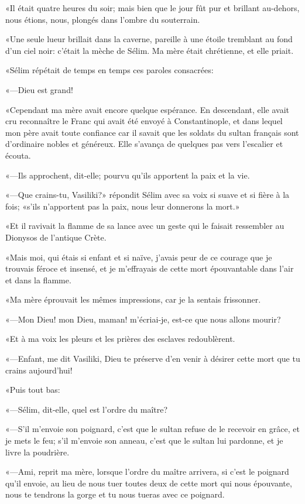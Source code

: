 «Il était quatre heures du soir; mais bien que le jour fût pur et brillant au-dehors, nous étions, nous, plongés dans l'ombre du souterrain. 

«Une seule lueur brillait dans la caverne, pareille à une étoile tremblant au fond d'un ciel noir: c'était la mèche de Sélim. Ma mère était chrétienne, et elle priait. 

«Sélim répétait de temps en temps ces paroles consacrées: 

«—Dieu est grand! 

«Cependant ma mère avait encore quelque espérance. En descendant, elle avait cru reconnaître le Franc qui avait été envoyé à Constantinople, et dans lequel mon père avait toute confiance car il savait que les soldats du sultan français sont d'ordinaire nobles et généreux. Elle s'avança de quelques pas vers l'escalier et écouta. 

«—Ils approchent, dit-elle; pourvu qu'ils apportent la paix et la vie. 

«—Que crains-tu, Vasiliki?» répondit Sélim avec sa voix si suave et si fière à la fois; «s'ils n'apportent pas la paix, nous leur donnerons la mort.» 

«Et il ravivait la flamme de sa lance avec un geste qui le faisait ressembler au Dionysos de l'antique Crète. 

«Mais moi, qui étais si enfant et si naïve, j'avais peur de ce courage que je trouvais féroce et insensé, et je m'effrayais de cette mort épouvantable dans l'air et dans la flamme. 

«Ma mère éprouvait les mêmes impressions, car je la sentais frissonner. 

«—Mon Dieu! mon Dieu, maman! m'écriai-je, est-ce que nous allons mourir? 

«Et à ma voix les pleurs et les prières des esclaves redoublèrent. 

«—Enfant, me dit Vasiliki, Dieu te préserve d'en venir à désirer cette mort que tu crains aujourd'hui! 

«Puis tout bas: 

«—Sélim, dit-elle, quel est l'ordre du maître? 

«—S'il m'envoie son poignard, c'est que le sultan refuse de le recevoir en grâce, et je mets le feu; s'il m'envoie son anneau, c'est que le sultan lui pardonne, et je livre la poudrière. 

«—Ami, reprit ma mère, lorsque l'ordre du maître arrivera, si c'est le poignard qu'il envoie, au lieu de nous tuer toutes deux de cette mort qui nous épouvante, nous te tendrons la gorge et tu nous tueras avec ce poignard. 


